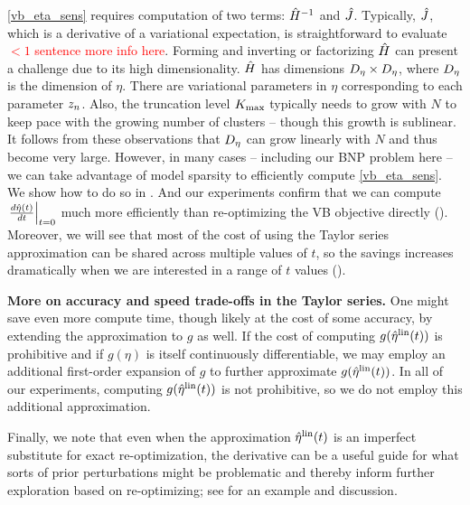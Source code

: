 \eqref{vb_eta_sens} requires computation of two terms: $\hat{H}^{-1}$
and  $\hat J$.  Typically, $\hat J$, which is a derivative of a
variational expectation, is straightforward to evaluate \textcolor{red}{$< 1$ sentence more info here}.  Forming and inverting or
factorizing $\hat{H}$ can present a challenge due to its high dimensionality. $\hat{H}$ has dimensions
${D_{\eta}} \times {D_{\eta}}$, where ${D_{\eta}}$ is the dimension of $\eta$. There are variational parameters in $\eta$ corresponding to each parameter $z_n$. Also, the truncation level ${K_{\mathrm{max}}}$ typically needs to grow with $N$ to keep pace with the growing number of clusters -- though this growth is sublinear. It follows from these observations that ${D_{\eta}}$ can grow linearly with $N$ and thus become very large.  However, in many
cases -- including our BNP problem here -- we can take advantage of model sparsity to
efficiently compute \eqref{vb_eta_sens}. We show how to do so in . And our experiments confirm that we can compute $\left.\frac{d \hat\eta(t)}{d t}\right\vert_{t=0}$ much more efficiently than re-optimizing the VB objective directly (). Moreover, we will see that most of the cost of using the Taylor series approximation can be shared across multiple values of $t$, so the savings increases dramatically when
we are interested in a range of $t$ values ().

\noindent \textbf{More on accuracy and speed trade-offs in the Taylor series.}
One might save even more compute time, though likely at the cost of some accuracy, by extending the approximation to $g$ as well.
If the cost of computing $g(\hat\eta^{\mathrm{lin}}(t))$ is prohibitive and if $g(\eta)$ is itself continuously differentiable, we may employ an additional
first-order expansion of $g$ to further approximate $g(\hat\eta^{\mathrm{lin}}(t))$. In all of our experiments, 
computing $g(\hat\eta^{\mathrm{lin}}(t))$ is not prohibitive, so we do not employ this additional approximation.

Finally, we note that even
when the approximation $\hat\eta^{\mathrm{lin}}(t)$ is an imperfect substitute
for exact re-optimization, the derivative can be a useful guide for what sorts
of prior perturbations might be problematic and thereby inform further exploration based
on re-optimizing; see  for an example and discussion.

